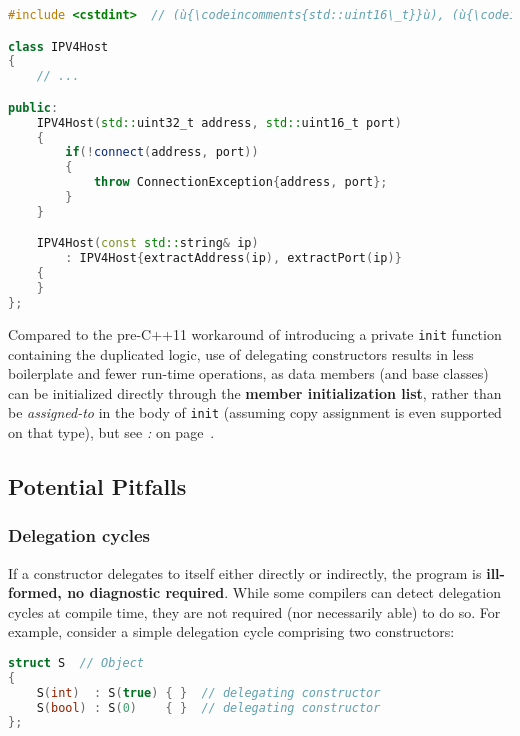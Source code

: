 \begin{lstlisting}[language=C++]
#include <cstdint>  // (ù{\codeincomments{std::uint16\_t}}ù), (ù{\codeincomments{std::uint32\_t}}ù)

class IPV4Host
{
    // ...

public:
    IPV4Host(std::uint32_t address, std::uint16_t port)
    {
        if(!connect(address, port))
        {
            throw ConnectionException{address, port};
        }
    }

    IPV4Host(const std::string& ip)
        : IPV4Host{extractAddress(ip), extractPort(ip)}
    {
    }
};
\end{lstlisting}
    
\noindent Compared to the pre-C++11 workaround of introducing a private
\texttt{init} function containing the duplicated logic, use of
delegating constructors results in less boilerplate and fewer run-time
operations, as data members (and base classes) can be initialized
directly through the \textbf{member initialization list}, rather than be
\emph{assigned-to} in the body of \texttt{init} (assuming copy
assignment is even supported on that type), but see
{\it{}:} {\it{}} on page~\pageref{suboptimal-factoring}. 

\subsection[Potential Pitfalls]{Potential Pitfalls}\label{ctordelegrating-potential-pitfalls}

\subsubsection[Delegation cycles]{Delegation cycles}\label{delegation-cycles}

If a constructor delegates to itself either directly or indirectly, the
program is \textbf{ill-formed, no diagnostic required}. While some
compilers can detect delegation cycles at compile time, they are not
required (nor necessarily able) to do so. For example, consider a simple
delegation cycle comprising two constructors:

\begin{lstlisting}[language=C++]
struct S  // Object
{
    S(int)  : S(true) { }  // delegating constructor
    S(bool) : S(0)    { }  // delegating constructor
};
\end{lstlisting}
    
